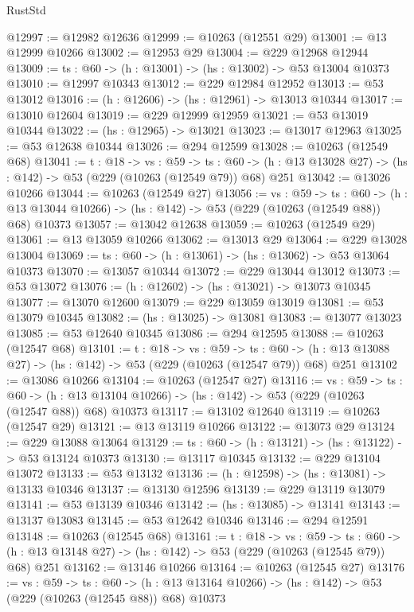 \begin{lexlean}{RustStd}
\begin{coremodule}
@12997 := @12982 @12636
@12999 := @10263 (@12551 @29)
@13001 := @13 @12999 @10266
@13002 := @12953 @29
@13004 := @229 @12968 @12944
@13009 := {ts : @60} -> (h : @13001) -> (hs : @13002) -> @53 @13004 @10373
@13010 := @12997 @10343
@13012 := @229 @12984 @12952
@13013 := @53 @13012
@13016 := (h : @12606) -> (hs : @12961) -> @13013 @10344
@13017 := @13010 @12604
@13019 := @229 @12999 @12959
@13021 := @53 @13019 @10344
@13022 := (hs : @12965) -> @13021
@13023 := @13017 @12963
@13025 := @53 @12638 @10344
@13026 := @294 @12599
@13028 := @10263 (@12549 @68)
@13041 := {t : @18} ->
  {vs : @59} ->
  {ts : @60} -> (h : @13 @13028 @27) -> (hs : @142) -> @53 (@229 (@10263 (@12549 @79)) @68) @251
@13042 := @13026 @10266
@13044 := @10263 (@12549 @27)
@13056 := {vs : @59} ->
  {ts : @60} ->
  (h : @13 @13044 @10266) -> (hs : @142) -> @53 (@229 (@10263 (@12549 @88)) @68) @10373
@13057 := @13042 @12638
@13059 := @10263 (@12549 @29)
@13061 := @13 @13059 @10266
@13062 := @13013 @29
@13064 := @229 @13028 @13004
@13069 := {ts : @60} -> (h : @13061) -> (hs : @13062) -> @53 @13064 @10373
@13070 := @13057 @10344
@13072 := @229 @13044 @13012
@13073 := @53 @13072
@13076 := (h : @12602) -> (hs : @13021) -> @13073 @10345
@13077 := @13070 @12600
@13079 := @229 @13059 @13019
@13081 := @53 @13079 @10345
@13082 := (hs : @13025) -> @13081
@13083 := @13077 @13023
@13085 := @53 @12640 @10345
@13086 := @294 @12595
@13088 := @10263 (@12547 @68)
@13101 := {t : @18} ->
  {vs : @59} ->
  {ts : @60} -> (h : @13 @13088 @27) -> (hs : @142) -> @53 (@229 (@10263 (@12547 @79)) @68) @251
@13102 := @13086 @10266
@13104 := @10263 (@12547 @27)
@13116 := {vs : @59} ->
  {ts : @60} ->
  (h : @13 @13104 @10266) -> (hs : @142) -> @53 (@229 (@10263 (@12547 @88)) @68) @10373
@13117 := @13102 @12640
@13119 := @10263 (@12547 @29)
@13121 := @13 @13119 @10266
@13122 := @13073 @29
@13124 := @229 @13088 @13064
@13129 := {ts : @60} -> (h : @13121) -> (hs : @13122) -> @53 @13124 @10373
@13130 := @13117 @10345
@13132 := @229 @13104 @13072
@13133 := @53 @13132
@13136 := (h : @12598) -> (hs : @13081) -> @13133 @10346
@13137 := @13130 @12596
@13139 := @229 @13119 @13079
@13141 := @53 @13139 @10346
@13142 := (hs : @13085) -> @13141
@13143 := @13137 @13083
@13145 := @53 @12642 @10346
@13146 := @294 @12591
@13148 := @10263 (@12545 @68)
@13161 := {t : @18} ->
  {vs : @59} ->
  {ts : @60} -> (h : @13 @13148 @27) -> (hs : @142) -> @53 (@229 (@10263 (@12545 @79)) @68) @251
@13162 := @13146 @10266
@13164 := @10263 (@12545 @27)
@13176 := {vs : @59} ->
  {ts : @60} ->
  (h : @13 @13164 @10266) -> (hs : @142) -> @53 (@229 (@10263 (@12545 @88)) @68) @10373

\end{coremodule}
\end{lexlean}
